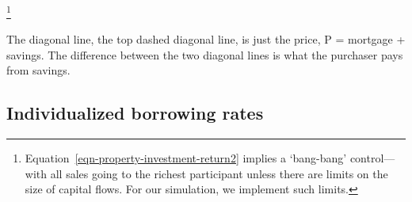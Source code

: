 {%



% 




\footnote{Equation~\ref{eqn-property-investment-return2} implies a `bang-bang' control---with all sales going to the richest participant unless there are limits on the size of capital flows. For our simulation, we implement such limits.} 

  
The diagonal line, the top dashed diagonal line, is just the price, P = mortgage + savings.
The difference between the two diagonal lines is what the purchaser pays from savings.  

\subsection{Individualized borrowing rates} \label{section-borowing-rate}

}
